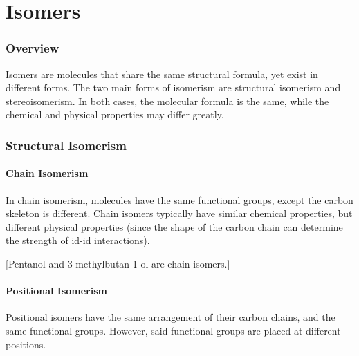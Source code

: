 

\pagebreak
\hypertarget{ChapterIsomers}{}
\part{Isomers}

	\section{Overview}

	Isomers are molecules that share the same structural formula, yet exist in different forms. The two main
	forms of isomerism are structural isomerism and stereoisomerism. In both cases, the molecular formula is the same,
	while the chemical and physical properties may differ greatly.


	\section{Structural Isomerism}

		\subsection{Chain Isomerism}

			In chain isomerism, molecules have the same functional groups, except the carbon skeleton is different. Chain isomers typically
			have similar chemical properties, but different physical properties (since the shape of the carbon chain can determine the
			strength of id-id interactions).

			\diagram[1.0]{
				\chemfig{!\molMeR-[:30]-[:-30]-[:30]-[:-30]-[:30]!\molOH}\hspace{10mm}
				\chemfig{!\molMeR-[:30]-[:-30](-[:270]!\molMe)-[:30]-[:-30]!\molOH}
			}[Pentanol and 3-methylbutan-1-ol are chain isomers.]




		\pagebreak
		\subsection{Positional Isomerism}
			Positional isomers have the same arrangement of their carbon chains, and the same functional groups. However, said
			functional groups are placed at different positions.

